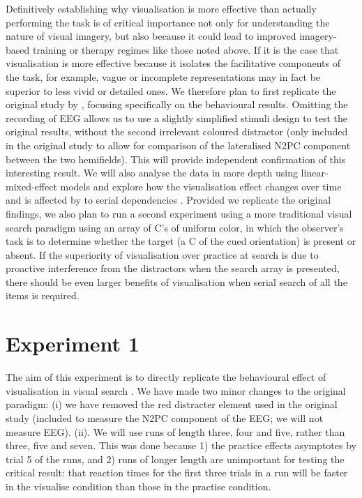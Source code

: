 \documentclass[smallextended]{svjour3}       %
\begin{document}
Definitively establishing why visualisation is more effective than actually performing the task is of critical importance not only for understanding the nature of visual imagery, but also because it could lead to improved imagery-based training or therapy regimes like those noted above. If it is the case that visualisation is more effective because it isolates the facilitative components of the task, for example, vague or incomplete representations may in fact be superior to less vivid or detailed ones. We therefore plan to first replicate the original study by \cite{reinhart2015}, focusing specifically on the behavioural results. Omitting the recording of EEG allows us to use a slightly simplified stimuli design to test the original results, without the second irrelevant coloured distractor (only included in the original study to allow for comparison of the lateralised N2PC component between the two hemifields). This will provide independent confirmation of this interesting result. We will also analyse the data in more depth using linear-mixed-effect models and explore how the visualisation effect changes over time and is affected by to serial dependencies \citep{fischer-whitney2014}. Provided we replicate the original findings, we also plan to run a second experiment using a more traditional visual search paradigm using an array of C's of uniform color, in which the observer's task is to determine whether the target (a C of the cued orientation) is present or absent. If the superiority of visualisation over practice at search is due to proactive interference from the distractors when the search array is presented, there should be even larger benefits of visualisation when serial search of all the items is required.  

\section{Experiment 1}
\label{sec:exp1}

The aim of this experiment is to directly replicate the behavioural effect of visualisation in visual search \citep{reinhart2015}. We have made two minor changes to the original paradigm: (i) we have removed the red distracter element used in the original study (included to measure the N2PC component of the EEG; we will not measure EEG). (ii). We will use runs of length three, four and five, rather than three, five and seven. This was done because 1) the practice effects asymptotes by trial 5 of the runs, and 2) runs of longer length are unimportant for testing the critical result: that reaction times for the first three trials in a run will be faster in the visualise condition than those in the practise condition. 
\end{document}
